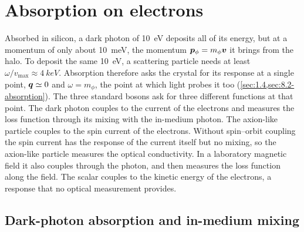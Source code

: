 \section{Absorption on electrons}\label{sec:10.7}

Absorbed in silicon, a dark photon of \SI{10}{eV} deposits all of its energy, but at a momentum of only about \SI{10}{meV}, the momentum $\bm{p}_\phi = m_\phi\bm{v}$ it brings from the halo. To deposit the same \SI{10}{eV}, a scattering particle needs at least $\omega/v_{\mathrm{max}} \approx \SI{4}{keV}$. Absorption therefore asks the crystal for its response at a single point, $\bm{q} \simeq 0$ and $\omega = m_\phi$, the point at which light probes it too (\cref{sec:1.4,sec:8.2-absorption}). The three standard bosons ask for three different functions at that point. The dark photon couples to the current of the electrons and measures the loss function through its mixing with the in-medium photon. The axion-like particle couples to the spin current of the electrons. Without spin--orbit coupling the spin current has the response of the current itself but no mixing, so the axion-like particle measures the optical conductivity. In a laboratory magnetic field it also couples through the photon, and then measures the loss function along the field. The scalar couples to the kinetic energy of the electrons, a response that no optical measurement provides.

\subsection{Dark-photon absorption and in-medium mixing}\label{sec:10.7-darkphoton}

